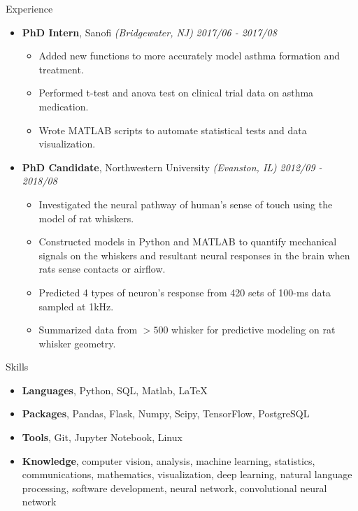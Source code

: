 \documentclass{resume} %
\begin{document}
\begin{rSection}{Experience}
\begin{itemize}
	\item {\bf PhD Intern}{, Sanofi \textit{(Bridgewater, NJ)}} \hfill {\em 2017/06 - 2017/08}\\
	\vspace{-5mm}
	\begin{itemize}
		\setlength\itemsep{-2em}	
		\item Added new functions to more accurately model asthma formation and treatment.\\
		\item Performed t-test and anova test on clinical trial data on asthma medication.\\ 
		\item Wrote MATLAB scripts to automate statistical tests and data visualization.
	\end{itemize}

	\item {\bf PhD Candidate}{, Northwestern University \textit{(Evanston, IL)}} \hfill {\em 2012/09 - 2018/08}\\
	\vspace{-5mm}
	\begin{itemize}
		\setlength\itemsep{-2em}
		\item Investigated the neural pathway of human's sense of touch using the model of rat whiskers.\\
		\item Constructed models in Python and MATLAB to quantify mechanical signals on the whiskers and resultant neural responses in the brain when rats sense contacts or airflow.\\
		\item Predicted 4 types of neuron’s response from 420 sets of 100-ms data sampled at 1kHz.\\
		\item Summarized data from $>500$ whisker for predictive modeling on rat whisker geometry. 		
	\end{itemize}

	
	\end{itemize}

\end{rSection}

\begin{rSection}{Skills}
\begin{itemize}
	\item {\bf Languages}{, Python, SQL, Matlab, LaTeX}
	\item {\bf Packages}{, Pandas, Flask, Numpy, Scipy, TensorFlow, PostgreSQL}
	\item {\bf Tools}{, Git, Jupyter Notebook, Linux}
	\item {\bf Knowledge}{, computer vision, analysis, machine learning, statistics, communications, mathematics, visualization, deep learning, natural language processing, software development, neural network, convolutional neural network}
	
\end{itemize}
\end{rSection}
\end{document}
